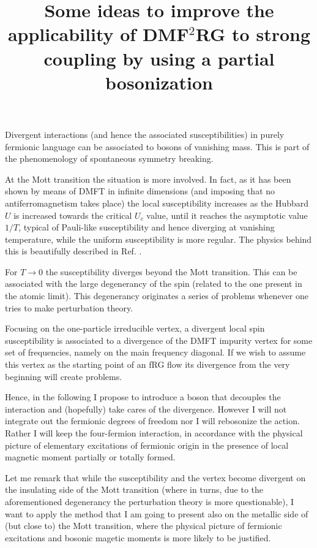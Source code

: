 \documentclass[a4paper,11pt]{article}
\author{}
\title{{\bf Some ideas to improve the applicability of DMF$^2$RG to strong coupling by using a partial bosonization }}
\begin{document}
\maketitle

Divergent interactions (and hence the associated susceptibilities) in purely fermionic language can be associated to bosons of vanishing mass. 
This is part of the phenomenology of spontaneous symmetry breaking. 


At the Mott transition the situation is more involved. In fact, as it has been shown by means of DMFT in infinite dimensions (and imposing that no antiferromagnetism takes place) the local susceptibility increases as the Hubbard $U$ is increased towards the critical $U_c$ value, until it reaches the asymptotic value $1/T$, typical of Pauli-like susceptibility and hence diverging at vanishing temperature, while the uniform susceptibility is more regular. The physics behind this is beautifully described in Ref. \cite{Georges1996}. 

For $T\rightarrow 0$ the susceptibility diverges beyond the Mott transition. This can be associated with the large degenerancy of the spin (related to the one present in the atomic limit). 
This degenerancy originates a series of problems whenever one tries to make perturbation theory. 

Focusing on the one-particle irreducible vertex, a divergent local spin susceptibility is associated to a divergence of the DMFT impurity vertex for some set of frequencies, namely on the main frequency diagonal. 
If we wish to assume this vertex as the starting point of an fRG flow its divergence from the very beginning will create problems.  

Hence, in the following I propose to introduce a boson that decouples the interaction and (hopefully) take cares of the divergence. 
However I will not integrate out the fermionic degrees of freedom nor I will rebosonize the action. 
Rather I will keep the four-fermion interaction, in accordance with the physical picture of elementary excitations of fermionic origin in the presence of local magnetic moment partially or totally formed. 

Let me remark that while the susceptibility and the vertex become divergent on the insulating side of the Mott transition (where in turns, due to the aforementioned degenerancy the perturbation theory is more questionable), I want to apply the method that I am going to present also on the metallic side of (but close to) the Mott transition, where the physical picture of fermionic excitations and bosonic magetic moments  is more likely to be justified. 
\end{document}
